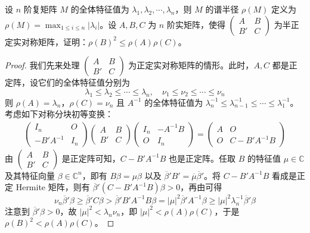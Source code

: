 \documentclass[../../main.tex]{subfiles}%
\begin{document}
\begin{proposition}\label{proposition:例9.57}
设 \(n\) 阶复矩阵 \(M\) 的全体特征值为 \(\lambda_1,\lambda_2,\cdots,\lambda_n\)，则 \(M\) 的谱半径 \(\rho(M)\) 定义为 \(\rho(M)=\max_{1\leqslant  i \leqslant  n}|\lambda_i|\)。设 \(A,B,C\) 为 \(n\) 阶实矩阵，使得 \(\begin{pmatrix}
A & B \\
B' & C
\end{pmatrix}\) 为半正定实对称矩阵，证明：\(\rho(B)^2 \leqslant  \rho(A)\rho(C)\)。
\end{proposition}
\begin{proof}
我们先来处理 \(\begin{pmatrix}
A & B \\
B' & C
\end{pmatrix}\) 为正定实对称矩阵的情形。此时，\(A,C\) 都是正定阵，设它们的全体特征值分别为
\[
\lambda_1 \leqslant  \lambda_2 \leqslant  \cdots \leqslant  \lambda_n,\quad \nu_1 \leqslant  \nu_2 \leqslant  \cdots \leqslant  \nu_n
\]
则 \(\rho(A) = \lambda_n\)，\(\rho(C) = \nu_n\) 且 \(A^{-1}\) 的全体特征值为 \(\lambda_n^{-1} \leqslant  \lambda_{n - 1}^{-1} \leqslant  \cdots \leqslant  \lambda_1^{-1}\)。考虑如下对称分块初等变换：
\begin{align*}
\begin{pmatrix}
I_n & O \\
-B'A^{-1} & I_n
\end{pmatrix}
\begin{pmatrix}
A & B \\
B' & C
\end{pmatrix}
\begin{pmatrix}
I_n & -A^{-1}B \\
O & I_n
\end{pmatrix}
=
\begin{pmatrix}
A & O \\
O & C - B'A^{-1}B
\end{pmatrix}
\end{align*}
由 \(\begin{pmatrix}
A & B \\
B' & C
\end{pmatrix}\) 是正定阵可知，\(C - B'A^{-1}B\) 也是正定阵。任取 \(B\) 的特征值 \(\mu \in \mathbb{C}\) 及其特征向量 \(\beta \in \mathbb{C}^n\)，即有 \(B\beta = \mu\beta\) 以及 \(\overline{\beta}'B' = \overline{\mu}\overline{\beta}'\)。将 \(C - B'A^{-1}B\) 看成是正定 Hermite 矩阵，则有 \(\overline{\beta}'(C - B'A^{-1}B)\beta > 0\)，再由可得
\[
\nu_n\overline{\beta}'\beta \geqslant  \overline{\beta}'C\beta > \overline{\beta}'B'A^{-1}B\beta = |\mu|^2\overline{\beta}'A^{-1}\beta \geqslant  |\mu|^2\lambda_n^{-1}\overline{\beta}'\beta
\]
注意到 \(\overline{\beta}'\beta > 0\)，故 \(|\mu|^2 < \lambda_n\nu_n\)，即 \(|\mu|^2 < \rho(A)\rho(C)\)，于是 \(\rho(B)^2 < \rho(A)\rho(C)\)。


\end{proof}
\end{document}
